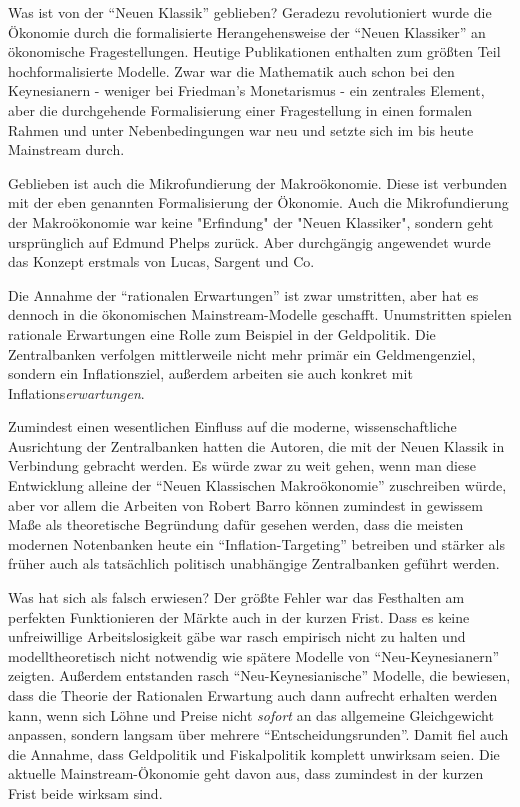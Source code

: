 Was ist von der "`Neuen Klassik"' geblieben? Geradezu revolutioniert wurde die Ökonomie durch die formalisierte Herangehensweise der "`Neuen Klassiker"' an ökonomische Fragestellungen. Heutige Publikationen enthalten zum größten Teil hochformalisierte Modelle. Zwar war die Mathematik auch schon bei den Keynesianern - weniger bei Friedman's Monetarismus - ein zentrales Element, aber die durchgehende Formalisierung einer Fragestellung in einen formalen Rahmen und unter Nebenbedingungen war neu und setzte sich im bis heute Mainstream durch.

Geblieben ist auch die Mikrofundierung der Makroökonomie. Diese ist verbunden mit der eben genannten Formalisierung der Ökonomie. Auch die Mikrofundierung der Makroökonomie war keine "Erfindung" der "Neuen Klassiker", sondern geht ursprünglich auf Edmund Phelps zurück. Aber durchgängig angewendet wurde das Konzept erstmals von Lucas, Sargent und Co.

Die Annahme der "`rationalen Erwartungen"' ist zwar umstritten, aber hat es dennoch in die ökonomischen Mainstream-Modelle geschafft. Unumstritten spielen rationale Erwartungen eine Rolle zum Beispiel in der Geldpolitik. Die Zentralbanken verfolgen mittlerweile nicht mehr primär ein Geldmengenziel, sondern ein Inflationsziel, außerdem arbeiten sie auch konkret mit Inflations\textit{erwartungen}.

Zumindest einen wesentlichen Einfluss auf die moderne, wissenschaftliche Ausrichtung der Zentralbanken hatten die Autoren, die mit der Neuen Klassik in Verbindung gebracht werden. Es würde zwar zu weit gehen, wenn man diese Entwicklung alleine der "`Neuen Klassischen Makroökonomie"' zuschreiben würde, aber vor allem die Arbeiten von Robert Barro können zumindest in gewissem Maße als theoretische Begründung dafür gesehen werden, dass die meisten modernen Notenbanken heute ein "`Inflation-Targeting"' betreiben und stärker als früher auch als tatsächlich politisch unabhängige Zentralbanken geführt werden.

Was hat sich als falsch erwiesen? Der größte Fehler war das Festhalten am perfekten Funktionieren der Märkte auch in der kurzen Frist. Dass es keine unfreiwillige Arbeitslosigkeit gäbe war rasch empirisch nicht zu halten und modelltheoretisch nicht notwendig wie spätere Modelle von "`Neu-Keynesianern"' zeigten. Außerdem entstanden rasch "`Neu-Keynesianische"' Modelle, die bewiesen, dass die Theorie der Rationalen Erwartung auch dann aufrecht erhalten werden kann, wenn sich Löhne und Preise nicht \textit{sofort} an das allgemeine Gleichgewicht anpassen, sondern langsam über mehrere "`Entscheidungsrunden"'. Damit fiel auch die Annahme, dass Geldpolitik und Fiskalpolitik komplett unwirksam seien. Die aktuelle Mainstream-Ökonomie geht davon aus, dass zumindest in der kurzen Frist beide wirksam sind.

